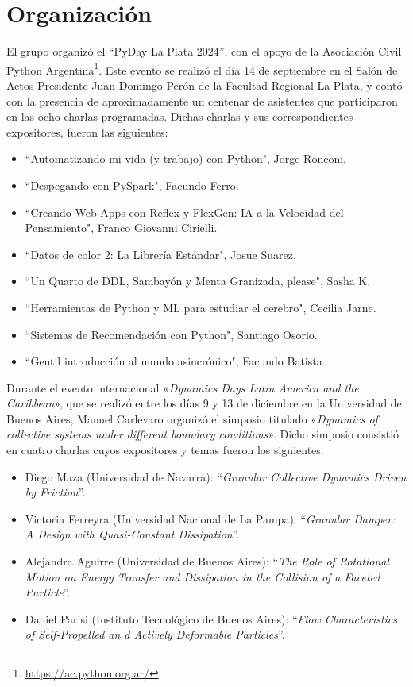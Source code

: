 \documentclass[a4paper,11pt,twoside,final,titlepage,onecolumn,openright]{report}
\begin{document}
\section{Organización}
\vspace{0.5cm}

El grupo organizó el ``PyDay La Plata 2024'', con el apoyo de la Asociación Civil Python Argentina\footnote{\url{https://ac.python.org.ar/}}. Este evento se realizó el día 14 de septiembre en el Salón de Actos Presidente Juan Domingo Perón de la Facultad Regional La Plata, y contó con la presencia de aproximadamente un centenar de asistentes que participaron en las ocho charlas programadas. Dichas charlas y sus correspondientes expositores, fueron las siguientes:
\begin{itemize}
\item ``Automatizando mi vida (y trabajo) con Python", Jorge Ronconi.
\item ``Despegando con PySpark", Facundo Ferro.
\item ``Creando Web Apps con Reflex y FlexGen: IA a la Velocidad del Pensamiento", Franco Giovanni Cirielli.
\item ``Datos de color 2: La Librería Estándar", Josue Suarez.
\item ``Un Quarto de DDL, Sambayón y Menta Granizada, please", Sasha K.
\item ``Herramientas de Python y ML para estudiar el cerebro", Cecilia Jarne.
\item ``Sistemas de Recomendación con Python", Santiago Osorio.
\item ``Gentil introducción al mundo asincrónico", Facundo Batista.
\end{itemize}

Durante el evento internacional «\textit{Dynamics Days Latin America and the Caribbean}», que se realizó entre los días 9 y 13 de diciembre en la Universidad de Buenos Aires, Manuel Carlevaro organizó el simposio titulado «\textit{Dynamics of collective systems under different boundary conditions}». Dicho simposio consistió en cuatro charlas cuyos expositores y temas fueron los siguientes:
\begin{itemize}
  \item Diego Maza (Universidad de Navarra): ``\textit{Granular Collective Dynamics Driven by Friction}''.
  \item Victoria Ferreyra (Universidad Nacional de La Pampa): ``\textit{Granular Damper: A Design with Quasi-Constant Dissipation}''.
  \item Alejandra Aguirre (Universidad de Buenos Aires): ``\textit{The Role of Rotational Motion on Energy Transfer and Dissipation in the Collision of a Faceted Particle}''.
  \item Daniel Parisi (Instituto Tecnológico de Buenos Aires): ``\textit{Flow Characteristics of Self-Propelled an d Actively Deformable Particles}''.
\end{itemize}
\end{document}
